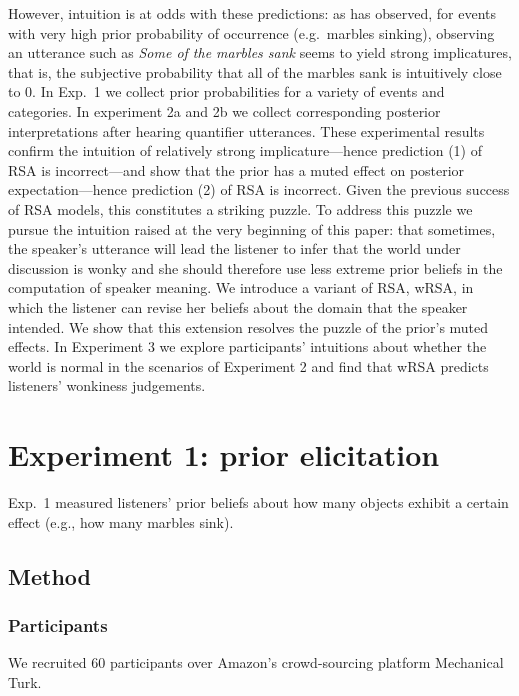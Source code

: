\documentclass[10pt,letterpaper]{article}
\begin{document}
However, intuition is at odds with these predictions: as  has observed, for events with very high prior probability of occurrence (e.g.~marbles sinking), observing an utterance such as \emph{Some of the marbles sank} seems to yield strong implicatures, that is, the subjective probability that all of the marbles sank is intuitively close to 0. 
%
In Exp.~1 we collect prior probabilities for a variety of events and categories. In experiment 2a and 2b we collect corresponding posterior interpretations after hearing quantifier utterances. These experimental results confirm the intuition of relatively strong implicature---hence prediction (1) of RSA is incorrect---and show that the prior has a muted effect on posterior expectation---hence prediction (2) of RSA is incorrect.
Given the previous success of RSA models, this constitutes a striking puzzle. 
To address this puzzle we pursue the intuition raised at the very beginning of this paper: that sometimes, the speaker's utterance will lead the listener to infer that the world under discussion is wonky and she should therefore use less extreme prior beliefs in the computation of speaker meaning. We introduce a variant of RSA, wRSA, in which the listener can revise her beliefs about the domain that the speaker intended. We show that this extension resolves the puzzle of the prior's muted effects.
In Experiment 3 we explore participants' intuitions about whether the world is normal in the scenarios of Experiment 2 and find that wRSA predicts listeners' wonkiness judgements.


\section{Experiment 1: prior elicitation} 

Exp.~1 measured listeners' prior beliefs about how many objects exhibit a certain effect (e.g., how many marbles sink).%

\subsection{Method}

\subsubsection{Participants}
We recruited 60 participants over Amazon's crowd-sourcing platform Mechanical Turk.
\end{document}
